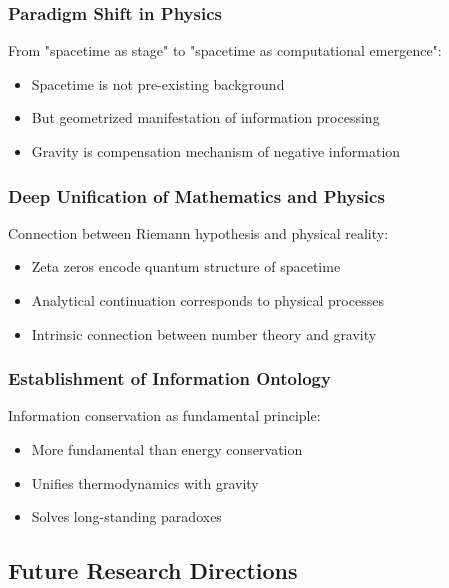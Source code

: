 \documentclass[12pt,a4paper]{article}
\begin{document}
\subsubsection{Paradigm Shift in Physics}

From "spacetime as stage" to "spacetime as computational emergence":
\begin{itemize}
\item Spacetime is not pre-existing background
\item But geometrized manifestation of information processing
\item Gravity is compensation mechanism of negative information
\end{itemize}

\subsubsection{Deep Unification of Mathematics and Physics}

Connection between Riemann hypothesis and physical reality:
\begin{itemize}
\item Zeta zeros encode quantum structure of spacetime
\item Analytical continuation corresponds to physical processes
\item Intrinsic connection between number theory and gravity
\end{itemize}

\subsubsection{Establishment of Information Ontology}

Information conservation as fundamental principle:
\begin{itemize}
\item More fundamental than energy conservation
\item Unifies thermodynamics with gravity
\item Solves long-standing paradoxes
\end{itemize}

\subsection{Future Research Directions}
\end{document}
